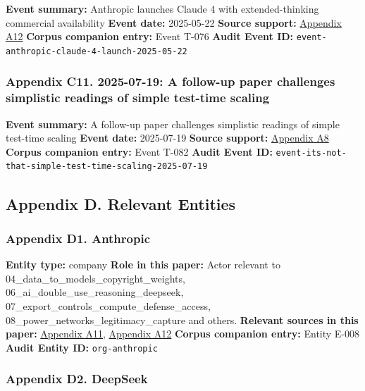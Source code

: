 \documentclass[
  american,
  11pt,
  letterpaper,
]{article}
\begin{document}
\textbf{Event summary:} Anthropic launches Claude 4 with
extended-thinking commercial availability \textbf{Event date:}
2025-05-22 \textbf{Source support:}
\hyperref[appendix-a12-introducing-claude-4]{Appendix A12}
\textbf{Corpus companion entry:} Event T-076 \textbf{Audit Event ID:}
\texttt{event-anthropic-claude-4-launch-2025-05-22}

\subsubsection{Appendix C11. 2025-07-19: A follow-up paper challenges
simplistic readings of simple test-time
scaling}\label{appendix-c11-2025-07-19-a-follow-up-paper-challenges-simplistic-readings-of-simple-test-time-scaling}

\textbf{Event summary:} A follow-up paper challenges simplistic readings
of simple test-time scaling \textbf{Event date:} 2025-07-19
\textbf{Source support:}
\hyperref[appendix-a8-it-s-not-that-simple-an-analysis-of-simple-test-time-scaling]{Appendix
A8} \textbf{Corpus companion entry:} Event T-082 \textbf{Audit Event
ID:} \texttt{event-its-not-that-simple-test-time-scaling-2025-07-19}

\subsection{Appendix D. Relevant
Entities}\label{appendix-d.-relevant-entities}

\subsubsection{Appendix D1. Anthropic}\label{appendix-d1-anthropic}

\textbf{Entity type:} company \textbf{Role in this paper:} Actor
relevant to 04\_data\_to\_models\_copyright\_weights,
06\_ai\_double\_use\_reasoning\_deepseek,
07\_export\_controls\_compute\_defense\_access,
08\_power\_networks\_legitimacy\_capture and others. \textbf{Relevant
sources in this paper:}
\hyperref[appendix-a11-plans-pricing-claude-by-anthropic]{Appendix A11},
\hyperref[appendix-a12-introducing-claude-4]{Appendix A12}
\textbf{Corpus companion entry:} Entity E-008 \textbf{Audit Entity ID:}
\texttt{org-anthropic}

\subsubsection{Appendix D2. DeepSeek}\label{appendix-d2-deepseek}
\end{document}
